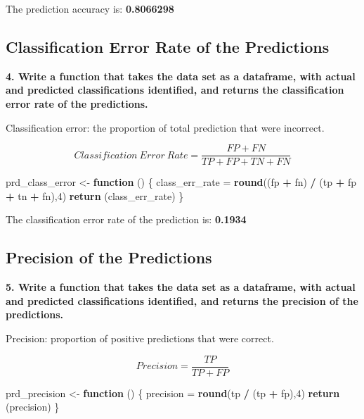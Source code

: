 \documentclass[]{article}
\newenvironment{Shaded}{\begin{snugshade}}{\end{snugshade}}
\newcommand{\ControlFlowTok}[1]{\textcolor[rgb]{0.13,0.29,0.53}{\textbf{#1}}}
\newcommand{\DecValTok}[1]{\textcolor[rgb]{0.00,0.00,0.81}{#1}}
\newcommand{\KeywordTok}[1]{\textcolor[rgb]{0.13,0.29,0.53}{\textbf{#1}}}
\newcommand{\NormalTok}[1]{#1}
\newcommand{\OperatorTok}[1]{\textcolor[rgb]{0.81,0.36,0.00}{\textbf{#1}}}
\newcommand{\StringTok}[1]{\textcolor[rgb]{0.31,0.60,0.02}{#1}}
\begin{document}
The prediction accuracy is: \textbf{0.8066298 }

\hypertarget{classification-error-rate-of-the-predictions}{%
\subsection{Classification Error Rate of the
Predictions}\label{classification-error-rate-of-the-predictions}}

\textbf{4. Write a function that takes the data set as a dataframe, with
actual and predicted classifications identified, and returns the
classification error rate of the predictions.}

Classification error: the proportion of total prediction that were
incorrect.

\[Classification\: Error\: Rate=\frac {FP+FN}{TP+FP+TN+FN}\]

\begin{Shaded}
\begin{Highlighting}[]
\NormalTok{prd_class_error <-}\StringTok{ }\ControlFlowTok{function}\NormalTok{ () \{}
\NormalTok{    class_err_rate =}\StringTok{ }\KeywordTok{round}\NormalTok{((fp }\OperatorTok{+}\StringTok{ }\NormalTok{fn) }\OperatorTok{/}\StringTok{ }\NormalTok{(tp }\OperatorTok{+}\StringTok{ }\NormalTok{fp }\OperatorTok{+}\StringTok{ }\NormalTok{tn }\OperatorTok{+}\StringTok{ }\NormalTok{fn),}\DecValTok{4}\NormalTok{)}
    \KeywordTok{return}\NormalTok{ (class_err_rate)}
\NormalTok{\}}
\end{Highlighting}
\end{Shaded}

The classification error rate of the prediction is: \textbf{0.1934 }

\hypertarget{precision-of-the-predictions}{%
\subsection{Precision of the
Predictions}\label{precision-of-the-predictions}}

\textbf{5. Write a function that takes the data set as a dataframe, with
actual and predicted classifications identified, and returns the
precision of the predictions. }

Precision: proportion of positive predictions that were correct.

\[Precision = \frac {TP}{TP + FP}\]

\begin{Shaded}
\begin{Highlighting}[]
\NormalTok{prd_precision <-}\StringTok{ }\ControlFlowTok{function}\NormalTok{ () \{}
\NormalTok{    precision =}\StringTok{ }\KeywordTok{round}\NormalTok{(tp }\OperatorTok{/}\StringTok{ }\NormalTok{(tp }\OperatorTok{+}\StringTok{ }\NormalTok{fp),}\DecValTok{4}\NormalTok{)}
    \KeywordTok{return}\NormalTok{ (precision)}
\NormalTok{\}}
\end{Highlighting}
\end{Shaded}
\end{document}
